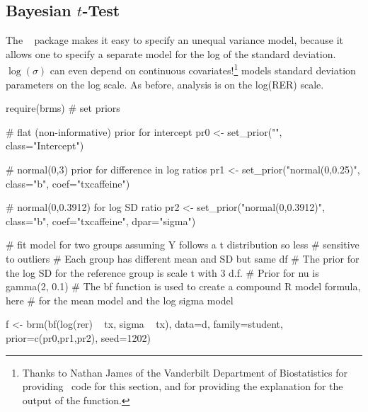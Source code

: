 \subsection{Bayesian $t$-Test}
The \R\  package makes it easy to specify an unequal variance
model, because it allows one to specify a separate model for the log
of the standard deviation.  $\log(\sigma)$ can even depend on
continuous covariates!\footnote{Thanks to Nathan James of the
  Vanderbilt Department of Biostatistics for providing \R\ code for
  this section, and for providing the explanation for the output of
  the  function.}   models standard
deviation parameters on the log scale.  As before, analysis is on the
log(RER) scale.
\begin{Schunk}
\begin{Sinput}
require(brms)
# set priors

# flat (non-informative) prior for intercept
pr0 <- set_prior("", class="Intercept")

# normal(0,3) prior for difference in log ratios
pr1 <- set_prior("normal(0,0.25)", class="b", coef="txcaffeine")

# normal(0,0.3912) for log SD ratio
pr2 <- set_prior("normal(0,0.3912)", class="b", coef="txcaffeine",
                 dpar="sigma")

# fit model for two groups assuming Y follows a t distribution so less 
# sensitive to outliers 
# Each group has different mean and SD but same df
# The prior for the log SD for the reference group is scale t with 3 d.f.
# Prior for nu is gamma(2, 0.1)
# The bf function is used to create a compound R model formula, here
# for the mean model and the log sigma model

f <- brm(bf(log(rer) ~ tx, sigma ~ tx), data=d, family=student,
            prior=c(pr0,pr1,pr2), seed=1202)
\end{Sinput}
\end{Schunk}

